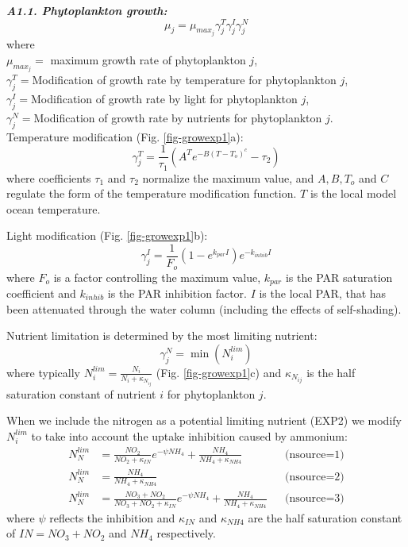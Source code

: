 \documentclass[11pt,letterpaper,english]{article}
\begin{document}
{\it {\bf A1.1. Phytoplankton growth:}}\\
\[
\mu_j = \mu_{max_{j}} \gamma_j^T \gamma_j^I \gamma_j^N
\]
where\\
\mbox{} \hspace{.5cm} $\mu_{max_{j}}=$ maximum growth rate of phytoplankton $j$,\\
\mbox{} \hspace{.5cm} $\gamma_j^T=$Modification of growth rate by
temperature for phytoplankton $j$,\\
\mbox{} \hspace{.5cm} $\gamma_j^I=$Modification of growth rate by light for
phytoplankton $j$,\\
\mbox{} \hspace{.5cm} $\gamma_j^N=$Modification of growth rate by nutrients
for phytoplankton $j$.\\

Temperature modification (Fig. \ref{fig-growexp1}a):\\
\[
\gamma_j^T= \frac{1}{\tau_1} (A^T e^{-B(T-T_o)^c} - \tau_2 )
\]
where coefficients $\tau_1$ and $\tau_2$ normalize the maximum
value, and $A,B,T_o$ and $C$ regulate the form of the temperature
modification function. $T$ is the local model ocean temperature.

Light modification (Fig. \ref{fig-growexp1}b):\\
\[
\gamma_j^I= \frac{1}{F_o} (1-e^{k_{par} I} ) e^{-k_{inhib} I}
\]
where $F_{o}$ is a factor controlling the maximum value, $k_{par}$ is the
PAR saturation coefficient and $k_{inhib}$ is the PAR inhibition factor.
$I$ is the local PAR, that has been attenuated through the water column
(including the effects of self-shading).

Nutrient limitation is determined by the most limiting nutrient:
\[
\gamma_j^N = \min(N_i^{lim})
\]
where typically
$N_i^{lim}=\frac{N_i}{N_i+\kappa_{N_{ij}}}$
(Fig. \ref{fig-growexp1}c) and $\kappa_{N_{ij}}$ is the half saturation constant of nutrient $i$ for phytoplankton $j$.

When we include the nitrogen as a potential limiting nutrient (EXP2) we 
modify $N_i^{lim}$ to take into account the uptake inhibition caused by ammonium:
\begin{align*}
N_N^{lim} &= \frac{NO_2}{NO_2+\kappa_{IN}} e^{-\psi NH_4}
+\frac{NH_4}{NH_4 + \kappa_{NH4}}  && \text{(nsource=1)} \\
N_N^{lim} &= \frac{NH_4}{NH_4 + \kappa_{NH4}}  && \text{(nsource=2)} \\
N_N^{lim} &= \frac{NO_3 + NO_2}{NO_3+NO_2+\kappa_{IN}} e^{-\psi NH_4}
+\frac{NH_4}{NH_4 + \kappa_{NH4}}  && \text{(nsource=3)}
\end{align*}
where $\psi$ reflects the inhibition and $\kappa_{IN}$ and $ \kappa_{NH4}$
are the half saturation constant of $IN=NO_3+NO_2$ and $NH_4$ respectively.
\end{document}
